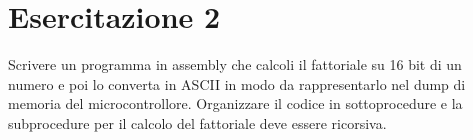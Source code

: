 \section{Esercitazione 2}
Scrivere un programma in assembly che calcoli il fattoriale su 16 bit di un numero e poi lo converta in ASCII in modo da rappresentarlo nel dump di memoria del microcontrollore.
Organizzare il codice in sottoprocedure e la subprocedure per il calcolo del fattoriale deve essere ricorsiva.
